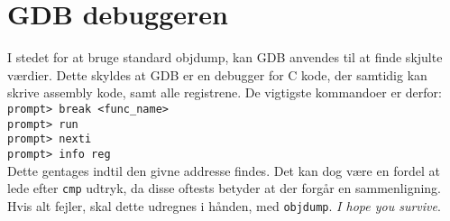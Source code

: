 \section{GDB debuggeren}
I stedet for at bruge standard objdump, kan GDB anvendes til at finde skjulte værdier.
Dette skyldes at GDB er en debugger for C kode, der samtidig kan skrive assembly kode, samt alle registrene.
De vigtigste kommandoer er derfor:\\
\verb|prompt> break <func_name>|\\
\verb|prompt> run|\\
\verb|prompt> nexti|\\
\verb|prompt> info reg|\\
Dette gentages indtil den givne addresse findes. 
Det kan dog være en fordel at lede efter \verb|cmp| udtryk, da disse oftests betyder at der forgår en sammenligning.
Hvis alt fejler, skal dette udregnes i hånden, med \verb|objdump|. \textit{I hope you survive}.

